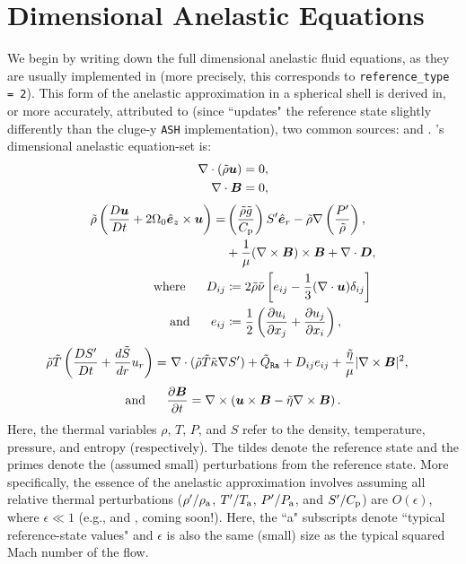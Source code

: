 \documentclass[12pt]{article}
\numberwithin{equation}{section}
\newcommand{\tmpa}{T_{\rm a}}
\newcommand{\rhoa}{\rho_{\rm a}}
\newcommand{\prsa}{P_{\rm a}}
\begin{document}
	\section{Dimensional Anelastic Equations}
	We begin by writing down the full dimensional anelastic fluid equations, as they are usually implemented in {\rayleigh} (more precisely, this corresponds to \texttt{reference\_type = 2}). This form of the anelastic approximation in a spherical shell is derived in, or more accurately, attributed to (since {\rayleigh} ``updates" the reference state slightly differently than the cluge-y \texttt{ASH} implementation), two common sources: \citet{Gilman1981} and \citet{Clune1999}. {\rayleigh}'s dimensional anelastic equation-set is:
	\begin{align}
		\nabla\cdot(\tilde{\rho}\bm{u}) &= 0\label{eq:contdim},\\
		\nabla\cdot \bm{B} &= 0,
	\end{align}
	\begin{subequations}\label{eq:momdim}
	\begin{align}
		\tilde{\rho}\left(\frac{D\bm{u}}{Dt}+2\Omega_0\hat{\bm{e}}_z\times\bm{u}\right) = &  \left(\frac{\tilde{\rho} \tilde{g}}{C_{\rm{p}}}\right) {S^\prime}\hat{\bm{e}}_r-\tilde{\rho}\nabla\left( \frac{{P^\prime}}{\tilde{\rho}} \right), \nonumber\\
		&+ \frac{1}{\mu}(\nabla\times\bm{B})\times\bm{B}+\nabla\cdot\bm{D},\\
		\text{where}\ \ \ \ \  D_{ij} &\coloneqq 2\tilde{\rho}\tilde{\nu} \left[e_{ij} - \frac{1}{3}(\nabla\cdot\bm{u}) \delta_{ij} \right]\label{eq:dstressdim}\\
		\text{and}\ \ \ \ \  e_{ij} &\coloneqq \frac{1}{2}\left(\frac{\partial u_i}{\partial x_j} + \frac{\partial u_j}{\partial x_i} \right),\label{eq:estressdim}
	\end{align}
	\end{subequations}
	\begin{align}\label{eq:endim}
		\tilde{\rho}\tilde{T} \left(\frac{D{S^\prime}}{Dt} + \frac{d\tilde{S}}{dr} u_r\right) = &\ \nabla\cdot(\tilde{\rho} \tilde{T} \tilde{\kappa} \nabla {S^\prime}) +\tilde{Q}_{\texttt{Ra}}+ D_{ij}e_{ij} + \frac{\tilde{\eta}}{\mu}|\nabla\times\bm{B}|^2,
	\end{align}
	\begin{align}\label{eq:inddim}
	\text{and}\ \ \ \ \  \frac{\partial\bm{B}}{\partial t} = \nabla\times\left(\bm{u}\times\bm{B} - \tilde{\eta}\nabla\times\bm{B}\right).
	\end{align}
	Here, the thermal variables $\rho$, $T$, $P$, and $S$ refer to the density, temperature, pressure, and entropy (respectively). The tildes denote the reference state and the primes denote the (assumed small) perturbations from the reference state. More specifically, the essence of the anelastic approximation involves assuming all relative thermal perturbations ($\rhoprime/\rhoa$, $\tmpprime/\tmpa$, $\prsprime/\prsa$, and ${S^\prime}/C_{\rm{p}}$) are $O(\epsilon)$, where $\epsilon\ll1$ (e.g., \citealt{Ogura1962,Gough1969} and \citealt{Matilsky2024b}, coming soon!). Here, the ``a" subscripts denote ``typical reference-state values" and $\epsilon$ is also the same (small) size as the typical squared Mach number of the flow. 
	
\end{document}
